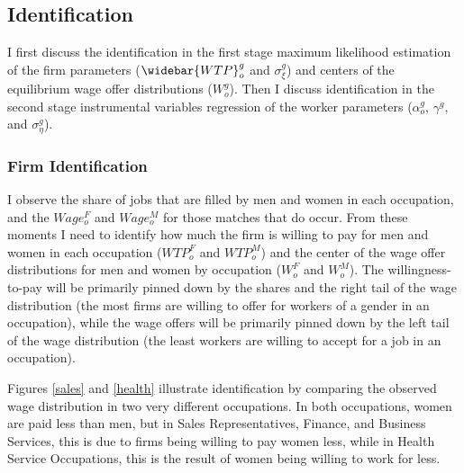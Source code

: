 \documentclass[12pt]{article}
\begin{document}
\subsection{Identification}
I first discuss the identification in the first stage maximum likelihood estimation of the firm parameters ($\widebar{WTP}^g_{o}$ and $\sigma^g_{\xi}$) and centers of the equilibrium wage offer distributions ($W^g_{o}$). Then I discuss identification in the second stage instrumental variables regression of the worker parameters ($\alpha^g_o$, $\gamma^g$, and $\sigma^g_{\eta}$).

\subsubsection{Firm Identification}

I observe the share of jobs that are filled by men and women in each occupation, and the $Wage^F_o$ and $Wage^M_o$ for those matches that do occur. From these moments I need to identify how much the firm is willing to pay for men and women in each occupation ($WTP^F_o$ and $WTP^M_o$) and the center of the wage offer distributions for men and women by occupation ($W^F_{o}$ and $W^M_{o}$). The willingness-to-pay will be primarily pinned down by the shares and the right tail of the wage distribution (the most firms are willing to offer for workers of a gender in an occupation), while the wage offers will be primarily pinned down by the left tail of the wage distribution (the least workers are willing to accept for a job in an occupation).


Figures \ref{sales} and \ref{health} illustrate identification by comparing the observed wage distribution in two very different occupations. In both occupations, women are paid less than men, but in Sales Representatives, Finance, and Business Services, this is due to firms being willing to pay women less, while in Health Service Occupations, this is the result of women being willing to work for less.
\end{document}

